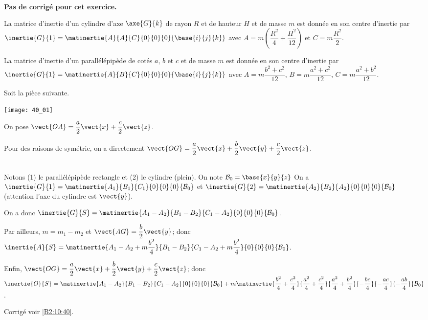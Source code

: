 \normaltrue \difficilefalse \tdifficilefalse
\correctiontrue


\setcounter{numques}{0}
\ifcorrection
\else
\textbf{Pas de corrigé pour cet exercice.}
\fi

\ifprof
\else
La matrice d'inertie d'un cylindre d'axe $\axe{G}{k}$ de rayon $R$ et de hauteur $H$ et de masse $m$ est donnée en son centre d'inertie par 
$\inertie{G}{1}=\matinertie{A}{A}{C}{0}{0}{0}{\base{i}{j}{k}}$ avec $A=m\left(\dfrac{R^2}{4}+\dfrac{H^2}{12} \right)$ et $C=m\dfrac{R^2}{2}$. 


La matrice d'inertie d'un parallélépipède de cotés $a$, $b$ et $c$ et de masse $m$ est donnée en son centre d'inertie par 
$\inertie{G}{1}=\matinertie{A}{B}{C}{0}{0}{0}{\base{i}{j}{k}}$ avec $A={m\dfrac{b^2+c^2}{12}}$, $B={m\dfrac{a^2+c^2}{12}}$, $C={m\dfrac{a^2+b^2}{12}}$.

Soit la pièce suivante. 
\begin{marginfigure}
\centering
\texttt{[image: 40\_01]}
\end{marginfigure}

On pose $\vect{OA}=\dfrac{a}{2}\vect{x}+\dfrac{c}{2}\vect{z}$. 
\fi



\ifprof
Pour des raisons de symétrie, on a directement $\vect{OG}=\dfrac{a}{2}\vect{x}+\dfrac{b}{2}\vect{y}+\dfrac{c}{2}\vect{z}$.
\else
\fi

\ifprof ~\\
Notons (1) le parallélépipède rectangle et (2) le cylindre (plein). On note $\mathcal{B}_0=\base{x}{y}{z}$
On a $\inertie{G}{1}=\matinertie{A_1}{B_1}{C_1}{0}{0}{0}{\mathcal{B}_0}$ et
$\inertie{G}{2}=\matinertie{A_2}{B_2}{A_2}{0}{0}{0}{\mathcal{B}_0}$ (attention l'axe du cylindre est $\vect{y}$).

On a donc $\inertie{G}{S}=\matinertie{A_1-A_2}{B_1-B_2}{C_1-A_2}{0}{0}{0}{\mathcal{B}_0}$.

Par ailleurs, $m=m_1-m_2$
et $\vect{AG}=\dfrac{b}{2}\vect{y}$; donc $\inertie{A}{S}=\matinertie{A_1-A_2+m\dfrac{b^2}{4}}{B_1-B_2}{C_1-A_2+m\dfrac{b^2}{4}}{0}{0}{0}{\mathcal{B}_0}$.

Enfin, $\vect{OG}=\dfrac{a}{2}\vect{x}+\dfrac{b}{2}\vect{y}+\dfrac{c}{2}\vect{z}$; donc
 $\inertie{O}{S}=
\matinertie{A_1-A_2}{B_1-B_2}{C_1-A_2}{0}{0}{0}{\mathcal{B}_0}
+m\matinertie{\dfrac{b^2}{4}+\dfrac{c^2}{4}}{\dfrac{a^2}{4}+\dfrac{c^2}{4}}{\dfrac{a^2}{4}+\dfrac{b^2}{4}}{-\dfrac{bc}{4}}{-\dfrac{ac}{4}}{-\dfrac{ab}{4}}{\mathcal{B}_0}$.
\else
\fi


\ifprof
\else
\begin{flushright}
\footnotesize{Corrigé voir \ref{B2:10:40}.}
\end{flushright}%
\fi